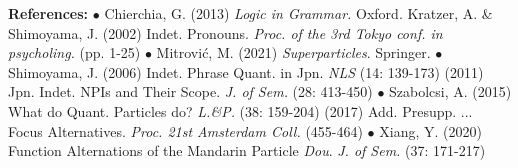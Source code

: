 \documentclass[11pt]{article}
\begin{document}

\noindent \textbf{References: } {\footnotesize$\bullet$ }Chierchia, G. (2013) \textit{Logic in Grammar.} Oxford. Kratzer, A. \& Shimoyama, J. (2002) Indet. Pronouns. \textit{Proc. of the 3rd Tokyo conf. in psycholing.} (pp. 1-25) {\footnotesize$\bullet$ }Mitrovi\'{c}, M. (2021) \textit{Superparticles}. Springer. {\footnotesize$\bullet$ }Shimoyama, J. (2006) Indet. Phrase Quant. in Jpn. \textit{NLS} (14: 139-173) (2011) Jpn. Indet. NPIs and Their Scope. \textit{J. of Sem.} (28: 413-450) {\footnotesize$\bullet$ }Szabolcsi, A. (2015) What do Quant. Particles do? \textit{L.\&P.} (38: 159-204) (2017) Add. Presupp. ... Focus Alternatives. \textit{Proc. 21st Amsterdam Coll.} (455-464) {\footnotesize$\bullet$ }Xiang, Y. (2020) Function Alternations of the Mandarin Particle \textit{Dou}. \textit{J. of Sem.} (37: 171-217)
\end{document}
